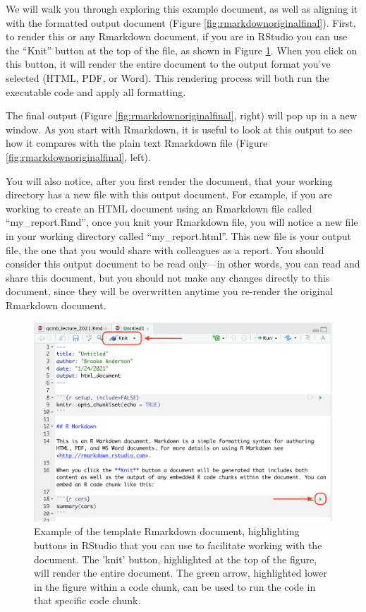\documentclass[]{tufte-book}
\begin{document}
We will walk you through exploring this example document, as well as aligning it
with the formatted output document (Figure \ref{fig:rmarkdownoriginalfinal}).
First, to render this or any Rmarkdown document, if you are in RStudio you can
use the ``Knit'' button at the top of the file, as shown in Figure
\ref{fig:rmarkdowntemplate2}. When you click on this button, it will render the
entire document to the output format you've selected (HTML, PDF, or Word). This
rendering process will both run the executable code and apply all formatting.

The final output (Figure \ref{fig:rmarkdownoriginalfinal}, right) will pop up
in a new window. As you start with Rmarkdown, it is useful to look at this
output to see how it compares with the plain text Rmarkdown file (Figure
\ref{fig:rmarkdownoriginalfinal}, left).

You will also notice, after you first render the document, that your working
directory has a new file with this output document. For example, if you are
working to create an HTML document using an Rmarkdown file called
``my\_report.Rmd'', once you knit your Rmarkdown file, you will notice a new file
in your working directory called ``my\_report.html''. This new file is your output
file, the one that you would share with colleagues as a report. You should
consider this output document to be read only---in other words, you can read and
share this document, but you should not make any changes directly to this
document, since they will be overwritten anytime you re-render the original
Rmarkdown document.

\begin{figure}
\includegraphics[width=\textwidth]{figures/rmarkdown_template2} \caption[Example of the template Rmarkdown document, highlighting buttons in RStudio that you can use to facilitate working with the document]{Example of the template Rmarkdown document, highlighting buttons in RStudio that you can use to facilitate working with the document. The 'knit' button, highlighted at the top of the figure, will render the entire document. The green arrow, highlighted lower in the figure within a code chunk, can be used to run the code in that specific code chunk.}\label{fig:rmarkdowntemplate2}
\end{figure}
\end{document}
